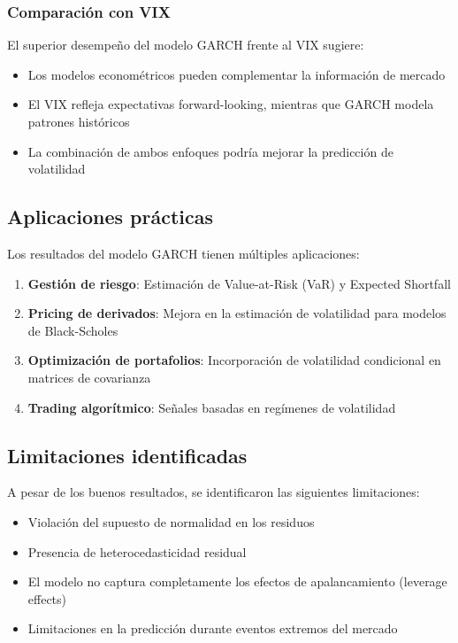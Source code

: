 \subsubsection{Comparación con VIX}

El superior desempeño del modelo GARCH frente al VIX sugiere:
\begin{itemize}
    \item Los modelos econométricos pueden complementar la información de mercado
    \item El VIX refleja expectativas forward-looking, mientras que GARCH modela patrones históricos
    \item La combinación de ambos enfoques podría mejorar la predicción de volatilidad
\end{itemize}

\subsection{Aplicaciones prácticas}

Los resultados del modelo GARCH tienen múltiples aplicaciones:

\begin{enumerate}
    \item \textbf{Gestión de riesgo}: Estimación de Value-at-Risk (VaR) y Expected Shortfall
    \item \textbf{Pricing de derivados}: Mejora en la estimación de volatilidad para modelos de Black-Scholes
    \item \textbf{Optimización de portafolios}: Incorporación de volatilidad condicional en matrices de covarianza
    \item \textbf{Trading algorítmico}: Señales basadas en regímenes de volatilidad
\end{enumerate}

\subsection{Limitaciones identificadas}

A pesar de los buenos resultados, se identificaron las siguientes limitaciones:

\begin{itemize}
    \item Violación del supuesto de normalidad en los residuos
    \item Presencia de heterocedasticidad residual
    \item El modelo no captura completamente los efectos de apalancamiento (leverage effects)
    \item Limitaciones en la predicción durante eventos extremos del mercado
\end{itemize}

